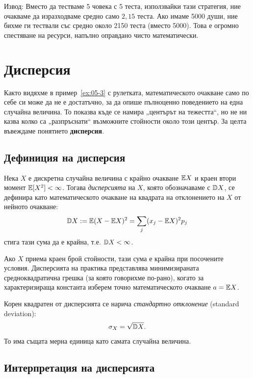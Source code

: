 Извод: Вместо да тестваме 5 човека с 5 теста, използвайки тази стратегия, ние очакваме да изразходваме средно само $2{,}15$ теста. Ако имаме 5000 души, ние бихме ги тествали със средно около 2150 теста (вместо 5000). Това е огромно спестяване на ресурси, напълно оправдано чисто математически.

\section{Дисперсия}

Както видяхме в пример~\ref{ex:05-3} с рулетката, математическото очакване само по себе си може да не е достатъчно, за да опише пълноценно поведението на една случайна величина. То показва къде се намира „центърът на тежестта“, но не ни казва колко са „разпръснати“ възможните стойности около този център. За целта въвеждаме понятието \textbf{дисперсия}.

\subsection{Дефиниция на дисперсия}

\begin{keydefn}
Нека $X$ е дискретна случайна величина с крайно очакване $\mathbb{E} X$ и краен втори момент
$\mathbb{E}[X^2]<\infty$. Тогава \emph{дисперсията} на $X$, която обозначаваме с $\mathbb{D} X$,
се дефинира като математическото очакване на квадрата на отклонението на $X$ от
нейното очакване:
\[ \mathbb{D} X := \mathbb{E}(X - \mathbb{E} X)^2 = \sum_{j} (x_j - \mathbb{E} X)^2 p_j \]
стига тази сума да е крайна, т.е. $\mathbb{D} X < \infty$.
\end{keydefn}

Ако $X$ приема краен брой стойности, тази сума е крайна при посочените условия.
Дисперсията на практика представлява минимизираната средноквадратична грешка (за
която говорихме по-рано), когато за характеризираща константа изберем точно
математическото очакване $a = \mathbb{E} X$.

\begin{defn}\label{def:stddev}
Корен квадратен от дисперсията се нарича \emph{стандартно отклонение} (standard deviation):
\[ \sigma_X = \sqrt{\mathbb{D} X} . \]
То има същата мерна единица като самата случайна величина.
\end{defn}

\subsection{Интерпретация на дисперсията}

